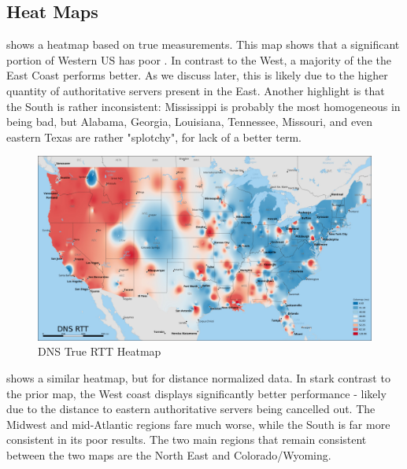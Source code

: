 \subsection{Heat Maps}

 shows a heatmap based on true \dns \rtt measurements. This map shows that a significant portion of Western US has poor \dns \rtts. In contrast to the West, a majority of the the East Coast performs better. As we discuss later, this is likely due to the higher quantity of authoritative servers present in the East. Another highlight is that the South is rather inconsistent: Mississippi is probably the most homogeneous in being bad, but Alabama, Georgia, Louisiana, Tennessee, Missouri, and even eastern Texas are rather "splotchy", for lack of a better term.

\begin{figure}[h]
    \centering
    \includegraphics{images/dns/heatmaps/dns_rtt_idw.jpg}
    \caption{DNS True RTT Heatmap}
    \label{fig:dns_true_rtt_heatmap}
\end{figure}

 shows a similar heatmap, but for distance normalized \dns \rtt data. In stark contrast to the prior map, the West coast displays significantly better performance - likely due to the distance to eastern authoritative servers being cancelled out. The Midwest and mid-Atlantic regions fare much worse, while the South is far more consistent in its poor results. The two main regions that remain consistent between the two maps are the North East and Colorado/Wyoming.

